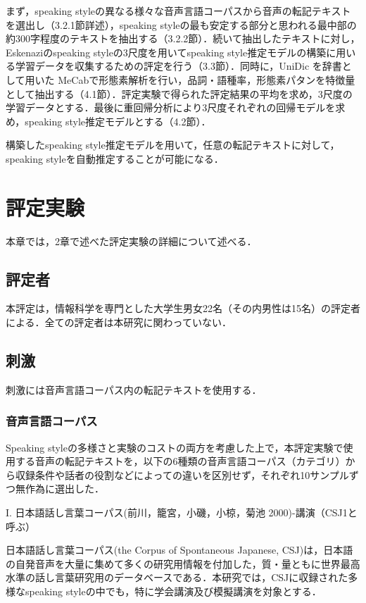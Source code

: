 \documentclass[japanese]{jnlp_1.4}
\begin{document}
まず，speaking styleの異なる様々な音声言語コーパスから音声の転記テキストを選出し（3.2.1節詳述），speaking styleの最も安定する部分と思われる最中部の約300字程度のテキストを抽出する（3.2.2節）．続いて抽出したテキストに対し，Eskenaziのspeaking styleの3尺度を用いてspeaking style推定モデルの構築に用いる学習データを収集するための評定を行う（3.3節）．同時に，UniDic を辞書として用いた MeCabで形態素解析を行い，品詞・語種率，形態素パタンを特徴量として抽出する（4.1節）．評定実験で得られた評定結果の平均を求め，3尺度の学習データとする．最後に重回帰分析により3尺度それぞれの回帰モデルを求め，speaking style推定モデルとする（4.2節）．

構築したspeaking style推定モデルを用いて，任意の転記テキストに対して， speaking styleを自動推定することが可能になる．


\section{評定実験}

本章では，2章で述べた評定実験の詳細について述べる．

\subsection{評定者}

本評定は，情報科学を専門とした大学生男女22名（その内男性は15名）の評定者による．全ての評定者は本研究に関わっていない．

\subsection{刺激}

刺激には音声言語コーパス内の転記テキストを使用する．

\subsubsection{音声言語コーパス}

Speaking styleの多様さと実験のコストの両方を考慮した上で，本評定実験で使用する音声の転記テキストを，以下の6種類の音声言語コーパス（カテゴリ）から収録条件や話者の役割などによっての違いを区別せず，それぞれ10サンプルずつ無作為に選出した．

\noindent
I. 日本語話し言葉コーパス(前川，籠宮，小磯，小椋，菊池 2000)-講演（CSJ1と呼ぶ）

日本語話し言葉コーパス(the Corpus of Spontaneous Japanese, CSJ)は，日本語の自発音声を大量に集めて多くの研究用情報を付加した，質・量ともに世界最高水準の話し言葉研究用のデータベースである．本研究では，CSJに収録された多様なspeaking styleの中でも，特に学会講演及び模擬講演を対象とする．
\end{document}

